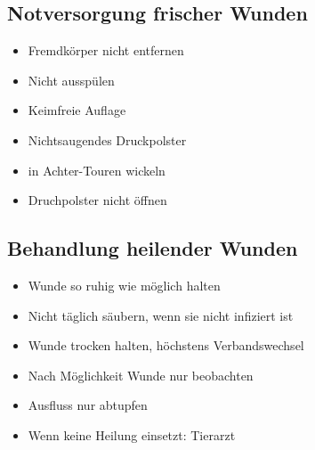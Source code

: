     \subsection{Notversorgung frischer Wunden}
        \begin{itemize}
            \item Fremdkörper nicht entfernen
            \item Nicht ausspülen
            \item Keimfreie Auflage
            \item Nichtsaugendes Druckpolster
            \item in Achter-Touren wickeln
            \item Druchpolster nicht öffnen
        \end{itemize}

    \subsection{Behandlung heilender Wunden}
        \begin{itemize}
            \item Wunde so ruhig wie möglich halten
            \item Nicht täglich säubern, wenn sie nicht infiziert ist
            \item Wunde trocken halten, höchstens Verbandswechsel
            \item Nach Möglichkeit Wunde nur beobachten
            \item Ausfluss nur abtupfen
            \item Wenn keine Heilung einsetzt: Tierarzt
        \end{itemize}